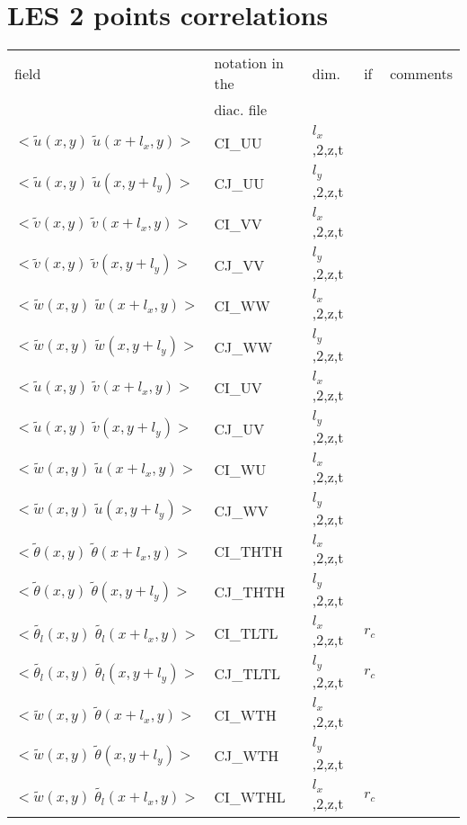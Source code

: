 \section{LES 2 points correlations}
\begin{center}
\begin{tabular}{||p{6cm}|>{\centering}p{2.5cm}|>{\centering}p{1.5cm}|>{\centering}p{0.5cm}|p{5cm }||}
\hline
\hline
field & notation in the & dim. &  if  & comments\\
& diac. file &           &  & \\
\hline
\hline
$<\tilde{u}(x,y)\;\tilde{u}(x+l_x,y)>$ & CI\_UU & $l_x$,2,z,t & & \\
\hline
$<\tilde{u}(x,y)\;\tilde{u}(x,y+l_y)>$ & CJ\_UU & $l_y$,2,z,t & & \\
\hline
$<\tilde{v}(x,y)\;\tilde{v}(x+l_x,y)>$ & CI\_VV & $l_x$,2,z,t & & \\
\hline
$<\tilde{v}(x,y)\;\tilde{v}(x,y+l_y)>$ & CJ\_VV & $l_y$,2,z,t & & \\
\hline
$<\tilde{w}(x,y)\;\tilde{w}(x+l_x,y)>$ & CI\_WW & $l_x$,2,z,t & & \\
\hline
$<\tilde{w}(x,y)\;\tilde{w}(x,y+l_y)>$ & CJ\_WW & $l_y$,2,z,t & & \\
\hline
$<\tilde{u}(x,y)\;\tilde{v}(x+l_x,y)>$ & CI\_UV & $l_x$,2,z,t & & \\
\hline
$<\tilde{u}(x,y)\;\tilde{v}(x,y+l_y)>$ & CJ\_UV & $l_y$,2,z,t & & \\
\hline
$<\tilde{w}(x,y)\;\tilde{u}(x+l_x,y)>$ & CI\_WU & $l_x$,2,z,t & & \\
\hline
$<\tilde{w}(x,y)\;\tilde{u}(x,y+l_y)>$ & CJ\_WV & $l_y$,2,z,t & & \\
\hline
$<\tilde{\theta}(x,y)\;\tilde{\theta}(x+l_x,y)>$ & CI\_THTH & $l_x$,2,z,t & & \\
\hline
$<\tilde{\theta}(x,y)\;\tilde{\theta}(x,y+l_y)>$ & CJ\_THTH & $l_y$,2,z,t & & \\
\hline
$<\tilde{\theta_l}(x,y)\;\tilde{\theta_l}(x+l_x,y)>$ & CI\_TLTL & $l_x$,2,z,t & $r_c$ & \\
\hline
$<\tilde{\theta_l}(x,y)\;\tilde{\theta_l}(x,y+l_y)>$ & CJ\_TLTL & $l_y$,2,z,t &  $r_c$& \\
\hline
$<\tilde{w}(x,y)\;\tilde{\theta}(x+l_x,y)>$ & CI\_WTH & $l_x$,2,z,t & & \\
\hline
$<\tilde{w}(x,y)\;\tilde{\theta}(x,y+l_y)>$ & CJ\_WTH & $l_y$,2,z,t & & \\
\hline
$<\tilde{w}(x,y)\;\tilde{\theta_l}(x+l_x,y)>$ & CI\_WTHL & $l_x$,2,z,t & $r_c$ & \\

\end{tabular}
\end{center}
